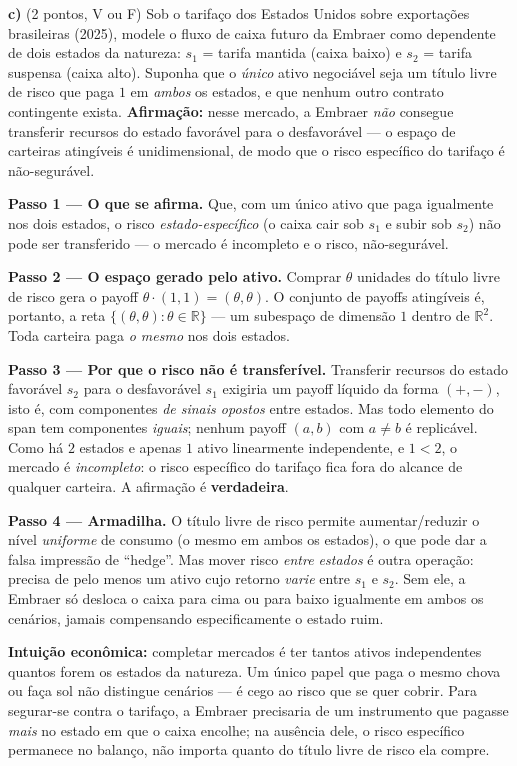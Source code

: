 \textbf{c)} (2 pontos, V ou F) Sob o tarifaço dos Estados Unidos sobre exportações brasileiras (2025), modele o fluxo de caixa futuro da Embraer como dependente de dois estados da natureza: $s_1$ = tarifa mantida (caixa baixo) e $s_2$ = tarifa suspensa (caixa alto). Suponha que o \emph{único} ativo negociável seja um título livre de risco que paga $1$ em \emph{ambos} os estados, e que nenhum outro contrato contingente exista. \textbf{Afirmação:} nesse mercado, a Embraer \emph{não} consegue transferir recursos do estado favorável para o desfavorável --- o espaço de carteiras atingíveis é unidimensional, de modo que o risco específico do tarifaço é não-segurável.

\begin{solucao}
\textbf{Passo 1 --- O que se afirma.} Que, com um único ativo que paga igualmente nos dois estados, o risco \emph{estado-específico} (o caixa cair sob $s_1$ e subir sob $s_2$) não pode ser transferido --- o mercado é incompleto e o risco, não-segurável.

\textbf{Passo 2 --- O espaço gerado pelo ativo.} Comprar $\theta$ unidades do título livre de risco gera o payoff $\theta\cdot(1,1)=(\theta,\theta)$. O conjunto de payoffs atingíveis é, portanto, a reta $\{(\theta,\theta):\theta\in\mathbb{R}\}$ --- um subespaço de dimensão $1$ dentro de $\mathbb{R}^2$. Toda carteira paga \emph{o mesmo} nos dois estados.

\textbf{Passo 3 --- Por que o risco não é transferível.} Transferir recursos do estado favorável $s_2$ para o desfavorável $s_1$ exigiria um payoff líquido da forma $(+,-)$, isto é, com componentes \emph{de sinais opostos} entre estados. Mas todo elemento do span tem componentes \emph{iguais}; nenhum payoff $(a,b)$ com $a\neq b$ é replicável. Como há $2$ estados e apenas $1$ ativo linearmente independente, e $1<2$, o mercado é \emph{incompleto}: o risco específico do tarifaço fica fora do alcance de qualquer carteira. A afirmação é \textbf{verdadeira}.

\textbf{Passo 4 --- Armadilha.} O título livre de risco permite aumentar/reduzir o nível \emph{uniforme} de consumo (o mesmo em ambos os estados), o que pode dar a falsa impressão de ``hedge''. Mas mover risco \emph{entre estados} é outra operação: precisa de pelo menos um ativo cujo retorno \emph{varie} entre $s_1$ e $s_2$. Sem ele, a Embraer só desloca o caixa para cima ou para baixo igualmente em ambos os cenários, jamais compensando especificamente o estado ruim.

\textbf{Intuição econômica:} completar mercados é ter tantos ativos independentes quantos forem os estados da natureza. Um único papel que paga o mesmo chova ou faça sol não distingue cenários --- é cego ao risco que se quer cobrir. Para segurar-se contra o tarifaço, a Embraer precisaria de um instrumento que pagasse \emph{mais} no estado em que o caixa encolhe; na ausência dele, o risco específico permanece no balanço, não importa quanto do título livre de risco ela compre.
\end{solucao}

